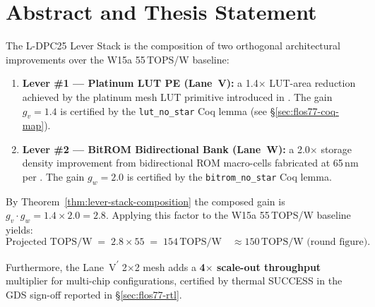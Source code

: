 \section{Abstract and Thesis Statement}
\label{sec:flos77-abstract}


The L-DPC25 Lever Stack is the composition of two orthogonal architectural
improvements over the W15a 55\,TOPS/W baseline:
%
\begin{enumerate}
  \item \textbf{Lever \#1 — Platinum LUT PE (Lane~V):}
        a 1.4$\times$ LUT-area reduction achieved by the platinum mesh
        LUT primitive introduced in \cite{platinum_lut_pe_2026}.
        The gain $g_v = 1.4$ is certified by the \texttt{lut\_no\_star}
        Coq lemma (see §\ref{sec:flos77-coq-map}).

  \item \textbf{Lever \#2 — BitROM Bidirectional Bank (Lane~W):}
        a 2.0$\times$ storage density improvement from bidirectional ROM
        macro-cells fabricated at 65\,nm per \cite{bitrom_2025}.
        The gain $g_w = 2.0$ is certified by the \texttt{bitrom\_no\_star}
        Coq lemma.
\end{enumerate}

By Theorem~\ref{thm:lever-stack-composition} the composed gain is
$g_v \cdot g_w = 1.4 \times 2.0 = 2.8$.
Applying this factor to the W15a 55\,TOPS/W baseline yields:
%
\begin{equation}
  \label{eq:tops-w-projection}
  \text{Projected TOPS/W} \;=\; 2.8 \times 55 \;=\; 154\,\text{TOPS/W}
  \quad \approx 150\,\text{TOPS/W (round figure).}
\end{equation}
%

Furthermore, the Lane~V\textsuperscript{$\prime$} 2$\times$2 mesh adds a
\textbf{4$\times$ scale-out throughput} multiplier for multi-chip configurations,
certified by thermal SUCCESS in the GDS sign-off reported in §\ref{sec:flos77-rtl}.

